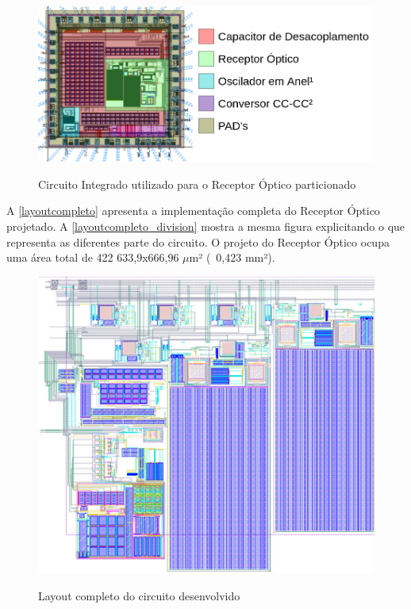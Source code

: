 \begin{figure}[htb]
 \centering
    \caption{Circuito Integrado utilizado para o Receptor Óptico particionado} 
    \includegraphics[scale=0.4]{Resultados/Imagens/Image_CircuitoIntegrado.png}
    \label{fig_circintegrado_division}
\end{figure}

A \autoref{layoutcompleto} apresenta a implementação completa do Receptor Óptico projetado. A \autoref{layoutcompleto_division} mostra a mesma figura explicitando o que representa as diferentes parte do circuito. O projeto do Receptor Óptico ocupa uma área total de 422 633,9x666,96 $\mu$m² (~0,423 mm²).

\begin{figure}[htb]
 \centering
    \caption{Layout completo do circuito desenvolvido} 
    \includegraphics[scale=1, angle = 90]{Resultados/Imagens/Circuito Completo.png}
    \label{layoutcompleto}
\end{figure}

